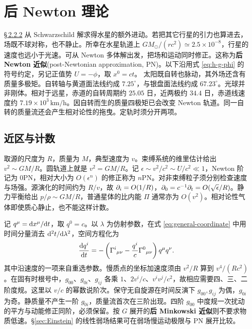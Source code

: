 \section{后 Newton 理论}\label{sec:exp-pn}

\hyperlink{subsection.2.2.2}{\S\,2.2.2} 从 Schwarzschild 解求得水星的额外进动。若把其它行星的引力也算进去，场既不球对称，也不静止。所幸在水星轨道上 $GM_\odot/(rc^2)\simeq2.5\times10^{-8}$，行星的速度也远小于光速。可从 Newton 多体解出发，把场和运动同时修正。这称为\textbf{后 Newton 近似}(post-Newtonian approximation, PN)。以下沿用式 \eqref{eq:h-g-phi} 的符号约定，另记正值势 $U=-\phi$，取 $x^0=ct$。
太阳既自转也脉动，其外场还含有质量多极矩。自转轴与黄道面法线约成 $7.25^\circ$，与银盘面法线约成 $67.23^\circ$。光球并非刚体。相对于远星，赤道的自转周期约 $25.05$ 日，近两极约 $34.4$ 日，赤道线速度约 $7.19\times10^3\,\mathrm{km/h}$。因自转而生的质量四极矩已会改变 Newton 轨道。同一自转的质量流还会产生相对论性的拖曳。定轨时须分开两项。

\subsection{近区与计数}

取源的尺度为 $R$，质量为 $M$，典型速度为 $v$。束缚系统的维里估计给出 $v^2\sim GM/R$。圆轨道上就是 $v^2=GM/R$。记 $\epsilon\sim v^2/c^2\sim U/c^2\ll1$，Newton 阶记为 0PN，相对大小为 $O(\epsilon^n)$ 的修正称为 $n$PN。对非束缚粒子须分别检查速度与场强。源演化的时间约为 $R/v$，故 $\partial_i=O(1/R)$，$\partial_0=c^{-1}\partial_t=O(\sqrt\epsilon/R)$。静力平衡给出 $p/\rho\sim GM/R$，普通星体的比内能 $\Pi$ 通常亦为 $O(v^2)$。相对论性气体即使质心静止，也不能这样计数。

记 $q^\mu=\dd x^\mu/\dd t$，取 $q^0=c$。以 $\lambda$ 为仿射参数，在式 \eqref{eq:general-coordinate} 中用时间分量消去 $\dd^2t/\dd\lambda^2$，空间方程化为
\begin{equation}\label{eq:pn-coordinate-geo}
 \frac{\dd q^i}{\dd t}=-\left(\Gamma^i{}_{\mu\nu}
                  -\frac{q^i}{c}\Gamma^0{}_{\mu\nu}\right)q^\mu q^\nu .
\end{equation}
其中沿速度的一项来自重选参数。慢质点的坐标加速度须由 $v^2/R$ 算到 $v^4/(Rc^2)$。在固有时根号中，$g_{00}$、$g_{0i}$、$g_{ij}$ 各乘 $1$、$2v^i/c$、$v^iv^j/c^2$，故相应需要四、三、二阶度规。这里以 $v/c$ 的幂数说阶次。保守无自旋源在时间反演下 $g_{00},g_{ij}$ 为偶，$g_{0i}$ 为奇。静质量不产生一阶 $g_{0i}$，质量流首次在三阶出现。四阶 $g_{00}$ 中度规一次扰动的平方与动能修正同阶，必须保留。按 $G$ 展开的\textbf{后 Minkowski 近似}则不要求物质低速。\S\ref{sec:Einstein} 的线性弱场结果可在弱场慢运动极限与 PN 展开比较。

